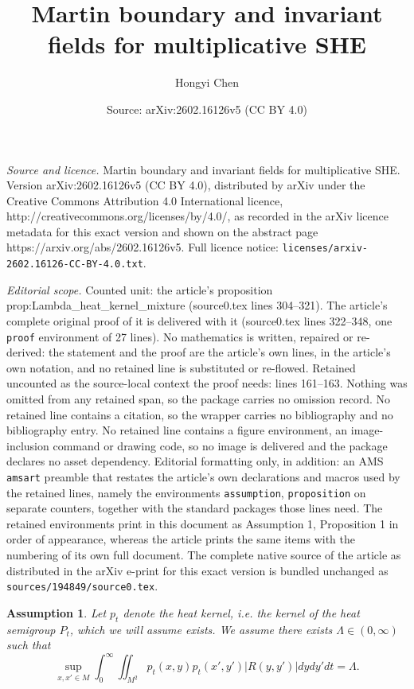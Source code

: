 \documentclass[10pt,a4paper]{amsart}
\title{Martin boundary and invariant fields for multiplicative SHE}
\author{Hongyi Chen}
\date{Source: arXiv:2602.16126v5 (CC BY 4.0)}
\newtheorem{assumption}{Assumption}
\begin{document}
\maketitle

\noindent\emph{Source and licence.} Martin boundary and invariant fields for multiplicative SHE. Version arXiv:2602.16126v5 (CC BY 4.0), distributed by arXiv under the Creative Commons Attribution 4.0 International licence, http://creativecommons.org/licenses/by/4.0/, as recorded in the arXiv licence metadata for this exact version and shown on the abstract page https://arxiv.org/abs/2602.16126v5. Full licence notice: \texttt{licenses/arxiv-2602.16126-CC-BY-4.0.txt}.\par\smallskip

\noindent\textit{Editorial scope.} Counted unit: the article's proposition prop:Lambda\_heat\_kernel\_mixture (source0.tex lines 304--321). The article's complete original proof of it is delivered with it (source0.tex lines 322--348, one \texttt{proof} environment of 27 lines). No mathematics is written, repaired or re-derived: the statement and the proof are the article's own lines, in the article's own notation, and no retained line is substituted or re-flowed.  Retained uncounted as the source-local context the proof needs: lines 161--163.  Nothing was omitted from any retained span, so the package carries no omission record.  No retained line contains a citation, so the wrapper carries no bibliography and no bibliography entry.  No retained line contains a figure environment, an image-inclusion command or drawing code, so no image is delivered and the package declares no asset dependency.  Editorial formatting only, in addition: an AMS \texttt{amsart} preamble that restates the article's own declarations and macros used by the retained lines, namely the environments \texttt{assumption}, \texttt{proposition} on separate counters, together with the standard packages those lines need.  The retained environments print in this document as Assumption 1, Proposition 1 in order of appearance, whereas the article prints the same items with the numbering of its own full document.  The complete native source of the article as distributed in the arXiv e-print for this exact version is bundled unchanged as \texttt{sources/194849/source0.tex}.
\begin{assumption}\label{assump:WD}
    Let $p_t$ denote the heat kernel, i.e. the kernel of the heat semigroup $P_t$, which we will assume exists. We assume there exists $\Lambda\in(0,\infty)$ such that \[\sup_{x,x'\in M}\int_0^{\infty}\iint_{M^2}p_t(x,y)p_t(x',y')|R(y,y')|dydy'dt=\Lambda.\]
\end{assumption}
\end{document}
